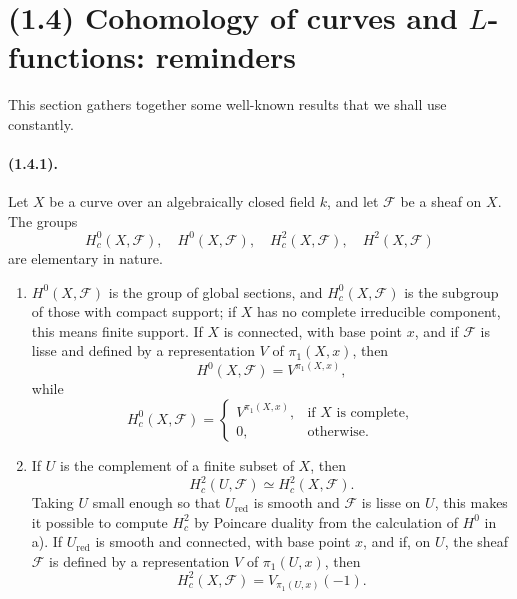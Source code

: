 \documentclass[11pt]{article}
\theoremstyle{remark}
\begin{document}
\section*{(1.4) Cohomology of curves and \texorpdfstring{$L$}{L}-functions: reminders}

This section gathers together some well-known results that we shall use constantly.

\paragraph{(1.4.1).} Let $X$ be a curve over an algebraically closed field $k$, and let $\mathcal F$ be a sheaf on $X$. The groups
\[
H^0_c(X,\mathcal F),\quad H^0(X,\mathcal F),\quad H^2_c(X,\mathcal F),\quad H^2(X,\mathcal F)
\]
are elementary in nature.

\begin{enumerate}[label=\alph*)]
\item $H^0(X,\mathcal F)$ is the group of global sections, and $H^0_c(X,\mathcal F)$ is the subgroup of those with compact support; if $X$ has no complete irreducible component, this means finite support. If $X$ is connected, with base point $x$, and if $\mathcal F$ is lisse and defined by a representation $V$ of $\pi_1(X,x)$, then
\begin{equation}\tag{1.4.1.1}
H^0(X,\mathcal F)=V^{\pi_1(X,x)},
\end{equation}
while
\begin{equation}\tag{1.4.1.2}
H^0_c(X,\mathcal F)=
\begin{cases}
V^{\pi_1(X,x)},&\text{if }X\text{ is complete},\\
0,&\text{otherwise}.
\end{cases}
\end{equation}

\item If $U$ is the complement of a finite subset of $X$, then
\[
H^2_c(U,\mathcal F)\simeq H^2_c(X,\mathcal F).
\]
Taking $U$ small enough so that $U_{\mathrm{red}}$ is smooth and $\mathcal F$ is lisse on $U$, this makes it possible to compute $H^2_c$ by Poincare duality from the calculation of $H^0$ in a). If $U_{\mathrm{red}}$ is smooth and connected, with base point $x$, and if, on $U$, the sheaf $\mathcal F$ is defined by a representation $V$ of $\pi_1(U,x)$, then
\begin{equation}\tag{1.4.1.3}
H^2_c(X,\mathcal F)=V_{\pi_1(U,x)}(-1).
\end{equation}
\end{enumerate}
\end{document}
